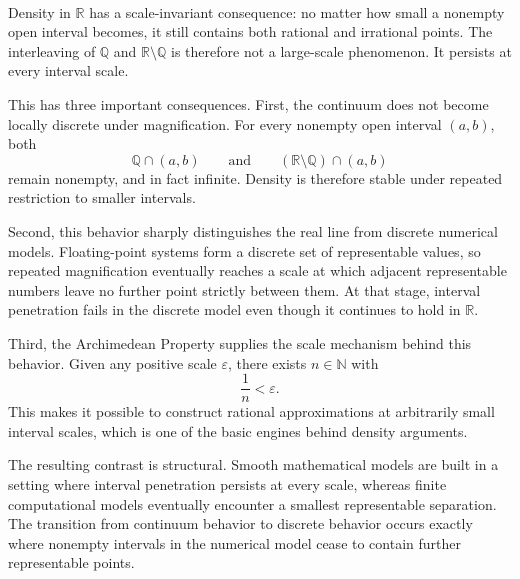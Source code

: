 \begin{remark*}~\\
Density in $\mathbb{R}$ has a scale-invariant consequence: no matter how small a nonempty
open interval becomes, it still contains both rational and irrational points. The interleaving
of $\mathbb{Q}$ and $\mathbb{R}\setminus\mathbb{Q}$ is therefore not a large-scale phenomenon.
It persists at every interval scale.

This has three important consequences. First, the continuum does not become locally discrete
under magnification. For every nonempty open interval $(a,b)$, both
\[
\mathbb{Q}\cap(a,b)
\qquad\text{and}\qquad
(\mathbb{R}\setminus\mathbb{Q})\cap(a,b)
\]
remain nonempty, and in fact infinite. Density is therefore stable under repeated restriction
to smaller intervals.

Second, this behavior sharply distinguishes the real line from discrete numerical models.
Floating-point systems form a discrete set of representable values, so repeated magnification
eventually reaches a scale at which adjacent representable numbers leave no further point
strictly between them. At that stage, interval penetration fails in the discrete model even
though it continues to hold in $\mathbb{R}$.

Third, the Archimedean Property supplies the scale mechanism behind this behavior. Given any
positive scale $\varepsilon$, there exists $n\in\mathbb{N}$ with
\[
\frac{1}{n}<\varepsilon.
\]
This makes it possible to construct rational approximations at arbitrarily small interval
scales, which is one of the basic engines behind density arguments.

The resulting contrast is structural. Smooth mathematical models are built in a setting where
interval penetration persists at every scale, whereas finite computational models eventually
encounter a smallest representable separation. The transition from continuum behavior to
discrete behavior occurs exactly where nonempty intervals in the numerical model cease to
contain further \\representable points.
\end{remark*}


